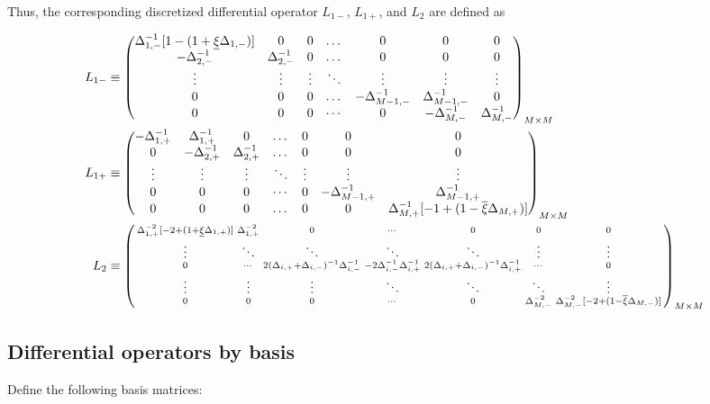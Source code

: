 \documentclass[11pt]{article}
\newenvironment{psmallmatrix}
{\left(\begin{smallmatrix}}
	{\end{smallmatrix}\right)}
\begin{document}
Thus, the corresponding discretized differential operator $L_{1-}$, $L_{1+}$, and $L_2$ are defined as 

\begin{align}
L_{1-} &\equiv \begin{pmatrix}
\Delta^{-1}_{1,-} [1 - (1 + \underline{\xi} \Delta_{1,-})] &0&0&\dots&0&0&0\\
-\Delta_{2,-}^{-1}&\Delta_{2,-}^{-1}&0&\dots&0&0&0\\
\vdots&\vdots&\vdots&\ddots&\vdots&\vdots&\vdots\\
0&0&0&\dots&-\Delta_{M-1,-}^{-1}&\Delta_{M-1,-}^{-1}&0\\
0&0&0&\cdots&0&-\Delta_{M,-}^{-1}&\Delta_{M,-}^{-1}
\end{pmatrix}_{M\times M}\label{eq:L-1} \\
L_{1+} &\equiv \begin{pmatrix}
-\Delta_{1,+}^{-1}&\Delta_{1,+}^{-1}&0&\dots&0&0&0\\
0&-\Delta_{2,+}^{-1}&\Delta_{2,+}^{-1}&\dots&0&0&0\\
\vdots&\vdots&\vdots&\ddots&\vdots&\vdots&\vdots\\
0&0&0&\cdots&0&-\Delta_{M-1,+}^{-1}&\Delta_{M-1,+}^{-1}\\
0&0&0&\dots&0&0&\Delta_{M,+}^{-1}  [-1 + (1 - \overline{\xi} \Delta_{M,+})]  \\
\end{pmatrix}_{M\times M}\label{eq:L-1-plus} \\
L_2 &\equiv \begin{psmallmatrix}
\Delta_{1,+}^{-2}[-2 + (1+\underline{\xi} \Delta_{1,+})] &\Delta_{1,+}^{-2}&0&\cdots&0&0&0 \\
\vdots&\ddots&\ddots&\ddots&\ddots&\vdots&\vdots\\
0&\cdots&2(\Delta_{i,+}+\Delta_{i,-})^{-1} \Delta_{i,-}^{-1} &-2\Delta_{i,-}^{-1} \Delta_{i,+}^{-1}  & 2 (\Delta_{i,+}+\Delta_{i,-})^{-1} \Delta_{i,+}^{-1}&\cdots&0 \\
\vdots&\vdots&\vdots&\ddots&\ddots&\ddots&\vdots\\
0&0&0&\cdots&0&\Delta_{M,-}^{-2}&\Delta_{M,-}^{-2} [-2 + (1- \overline{\xi}\Delta_{M,-})]
\end{psmallmatrix}_{M\times M}\label{eq:L-2}
\end{align}

\subsection{Differential operators by basis}
Define the following basis matrices:
\end{document}
